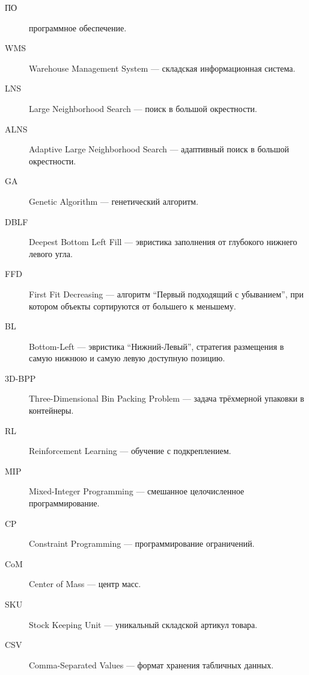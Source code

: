 \Abbreviations
\begin{description}
    \item[ПО] программное обеспечение.
    \item[WMS] Warehouse Management System --- складская информационная система.
    \item[LNS] Large Neighborhood Search --- поиск в большой окрестности.
    \item[ALNS] Adaptive Large Neighborhood Search --- адаптивный поиск в большой окрестности.
    \item[GA] Genetic Algorithm --- генетический алгоритм.
    \item[DBLF] Deepest Bottom Left Fill --- эвристика заполнения от глубокого нижнего левого угла.
    \item[FFD] First Fit Decreasing --- алгоритм ``Первый подходящий с убыванием'', при котором объекты сортируются от большего к меньшему.
    \item[BL] Bottom-Left --- эвристика ``Нижний-Левый'', стратегия размещения в самую нижнюю и самую левую доступную позицию.
    \item[3D-BPP] Three-Dimensional Bin Packing Problem --- задача трёхмерной упаковки в контейнеры.
    \item[RL] Reinforcement Learning --- обучение с подкреплением.
    \item[MIP] Mixed-Integer Programming --- смешанное целочисленное программирование.
    \item[CP] Constraint Programming --- программирование ограничений.
    \item[CoM] Center of Mass --- центр масс.
    \item[SKU] Stock Keeping Unit --- уникальный складской артикул товара.
    \item[CSV] Comma-Separated Values --- формат хранения табличных данных.
\end{description}

